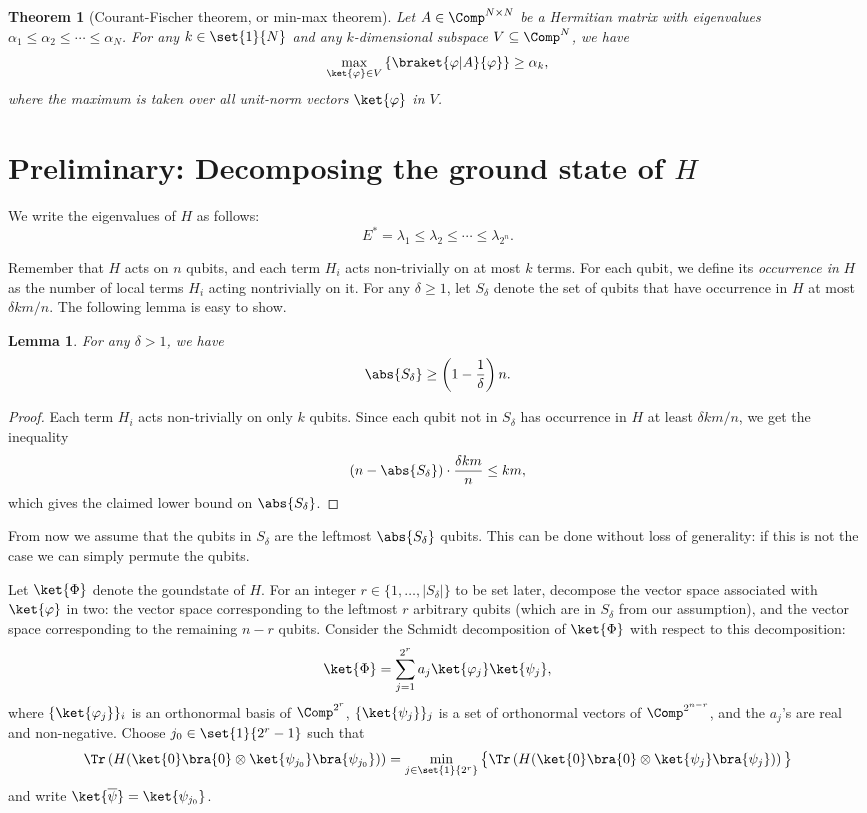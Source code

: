 \documentclass[11pt,a4paper]{article}
\theoremstyle{plain}
\newtheorem{theorem}{Theorem}
\newtheorem{lemma}{Lemma}
\theoremstyle{definition}
\begin{document}
\begin{theorem}[Courant-Fischer theorem, or min-max theorem]\label{th:minmax}
Let $A\in\Comp^{N\times N}$ be a Hermitian matrix with eigenvalues $\alpha_1\le\alpha_2\le\cdots\le\alpha_{N}$. For any $k\in\set{1}{N}$ and any $k$-dimensional subspace $V\subseteq \Comp^N$, we have 
\[
\max_{\ket{\varphi}\in V}\left\{\braket{\varphi|A}{\varphi}\right\}\ge \alpha_k,
\]
where the maximum is taken over all unit-norm vectors $\ket{\varphi}$ in $V$.
\end{theorem}

\section{Preliminary: Decomposing the ground state of $H$}\label{sec:pre}
We write the eigenvalues of $H$ as follows:
\[
E^\ast=\lambda_1\le\lambda_2\le\cdots\le\lambda_{2^n}.
\]

Remember that $H$ acts on $n$ qubits, and each term $H_i$ acts non-trivially on at most $k$ terms. For each qubit, we define its \emph{occurrence in }$H$ as the number of local terms $H_i$ acting nontrivially on it. For any $\delta\ge 1$, let $S_\delta$ denote the set of qubits that have occurrence in $H$ at most $\delta km/n$. The following lemma is easy to show.

\begin{lemma}\label{lemma:delta}
For any $\delta> 1$, we have 
\[
\abs{S_\delta}\ge \left(1-\frac{1}{\delta}\right)n.
\]
\end{lemma}
\begin{proof}
Each term $H_i$ acts non-trivially on only $k$ qubits. Since each qubit not in $S_\delta$ has  occurrence in $H$ at least $\delta km/n$, we get the inequality 
\[
\left(n-\abs{S_\delta}\right)\cdot \frac{\delta km}{n} \le km,
\]
which gives the claimed lower bound on $\abs{S_\delta}$.
\end{proof}
From now we assume that the qubits in $S_\delta$ are the leftmost $\abs{S_\delta}$ qubits. This can be done without loss of generality: if this is not the case we can simply permute the qubits.

Let $\ket{\Phi}$ denote the goundstate of $H$. For an integer $r\in\{1,\ldots,|S_\delta|\}$ to be set later, decompose the vector space associated with $\ket{\varphi}$ in two: the vector space corresponding to the leftmost $r$ arbitrary qubits (which are in $S_\delta$ from our assumption), and the vector space corresponding to the remaining $n-r$ qubits. Consider the Schmidt decomposition of $\ket{\Phi}$ with respect to this decomposition:
\[
\ket{\Phi}=\sum_{j=1}^{2^r}a_j\ket{\varphi_j}\ket{\psi_j},
\]
where $\{\ket{\varphi_j}\}_i$ is an orthonormal basis of $\Comp^{2^r}$, $\{\ket{\psi_j}\}_j$ is a set of orthonormal vectors of $\Comp^{2^{n-r}}$, and the $a_j$'s are real and non-negative. Choose $j_0\in\set{1}{2^r-1}$ such that 
\[
\Tr\left(H(\ket{0}\bra{0}\otimes \ket{\psi_{j_0}}\bra{\psi_{j_0}})\right)
=\min_{j\in\set{1}{2^r}}
\big\{
\Tr\left(H(\ket{0}\bra{0}\otimes \ket{\psi_j}\bra{\psi_j})\right)
\big\}
\]
and write $\ket{\overline{\psi}}=\ket{\psi_{j_0}}$.
\end{document}
